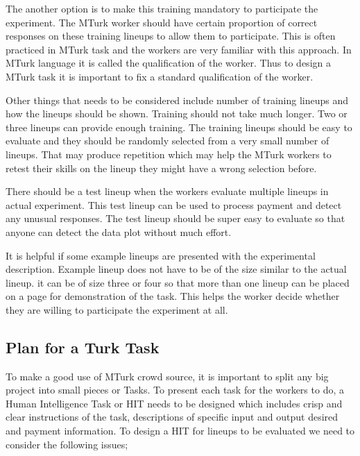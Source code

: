 \documentclass[11pt]{article}
\begin{document}
The another option is to make this training mandatory to participate the experiment. The MTurk worker should have certain proportion of correct responses on these training lineups to allow them to participate. This is often practiced in MTurk task and the workers are very familiar with this approach. In MTurk language it is called the qualification of the worker. Thus to design a MTurk task it is important to fix a standard qualification of the worker.

Other things that needs to be considered include number of training lineups and how the lineups should be shown. Training should not take much longer. Two or three lineups can provide enough training. The training lineups should be easy to evaluate and they should be randomly selected from a very small number of lineups. That may produce repetition which may help the MTurk workers to retest their skills on the lineup they might have a wrong selection before. 

There should be a test lineup when the workers evaluate multiple lineups in actual experiment. This test lineup can be used to process payment and detect any unusual responses. The test lineup should be super easy to evaluate so that anyone can detect the data plot without much effort.

It is helpful if some example lineups are presented with the experimental description. Example lineup does not have to be of the size similar to the actual lineup. it can be of size three or four so that more than one lineup can be placed on a page for demonstration of the task. This helps the worker decide whether they are willing to participate the experiment at all.

\subsection{Plan for a Turk Task} \label{sec:task_plan} To make a good use of MTurk crowd source, it is important to split any big project into small pieces or Tasks. To present each task for the workers to do, a Human Intelligence Task or HIT needs to be designed which includes crisp and clear instructions of the task, descriptions of specific input and output desired and payment information. To design a HIT for lineups to be evaluated we need to consider the following issues;
\end{document}
